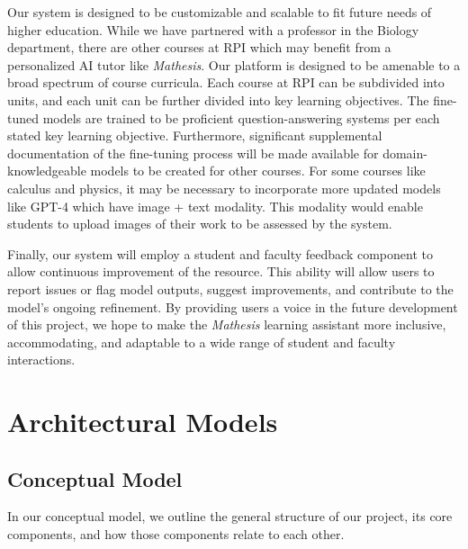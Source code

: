 \documentclass[12pt,a4paper]{article}
\begin{document}
    Our system is designed to be customizable and scalable to fit future needs of higher education.
    While we have partnered with a professor in the Biology department, there are other courses at
    RPI which may benefit from a personalized AI tutor like \textit{Mathesis}. Our platform is
    designed to be amenable to a broad spectrum of course curricula. Each course at RPI can be
    subdivided into units, and each unit can be further divided into key learning objectives. The
    fine-tuned models are trained to be proficient question-answering systems per each stated key
    learning objective. Furthermore, significant supplemental documentation of the fine-tuning
    process will be made available for domain-knowledgeable models to be created for other courses.
    For some courses like calculus and physics, it may be necessary to incorporate more updated
    models like GPT-4 which have image + text modality. This modality would enable students to upload
    images of their work to be assessed by the system.

    Finally, our system will employ a student and faculty feedback component to allow continuous
    improvement of the resource. This ability will allow users to report issues or flag model outputs,
    suggest improvements, and contribute to the model's ongoing refinement. By providing users a
    voice in the future development of this project, we hope to make the \textit{Mathesis} learning assistant
    more inclusive, accommodating, and adaptable to a wide range of student and faculty interactions.

    \section{Architectural Models}

    \subsection{Conceptual Model}
    
    In our conceptual model, we outline the general structure of our project, its core components,
    and how those components relate to each other.
\end{document}
